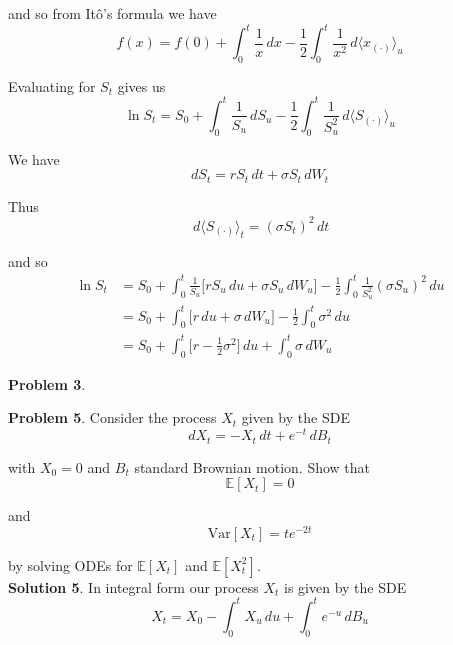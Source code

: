 \documentclass[12pt]{article}
\begin{document}
and so from It\^{o}'s formula we have
\begin{equation*}
	f(x) = f(0) + \int^t_0 \frac{1}{x} \,dx - \frac{1}{2}\int^t_0 \frac{1}{x^2} \,d\langle x_{(\cdot)}\rangle_u
\end{equation*}

Evaluating for $S_t$ gives us
\begin{equation*}
	\ln S_t = S_0 + \int^t_0 \frac{1}{S_u} \,dS_u - \frac{1}{2}\int^t_0 \frac{1}{S_u^2} \,d\langle S_{(\cdot)}\rangle_u
\end{equation*}

We have
\begin{equation*}
	dS_t = rS_t\,dt + \sigma S_t\,dW_t
\end{equation*}

Thus
\begin{equation*}
	\,d\langle S_{(\cdot)}\rangle_t = (\sigma S_t)^2\,dt
\end{equation*}

and so
\begin{align*}
	\ln S_t &= S_0 + \int^t_0 \frac{1}{S_u} \big[rS_u\,du + \sigma S_u\,dW_u \big] - \frac{1}{2}\int^t_0 \frac{1}{S_u^2} (\sigma S_u)^2\,du \\
	&= S_0 + \int^t_0 \big[r\,du + \sigma\,dW_u \big] - \frac{1}{2}\int^t_0 \sigma^2\,du \\
	&= S_0 + \int^t_0 \big[r - \frac{1}{2}\sigma^2\big] \,du + \int^t_0 \sigma\,dW_u
\end{align*}



{\bf Problem 3}.

{\bf Problem 5}. Consider the process $X_t$ given by the SDE
\begin{equation*}
	dX_t = -X_t\,dt + e^{-t}\,dB_t
\end{equation*}

with $X_0 = 0$ and $B_t$ standard Brownian motion. Show that
\begin{equation*}
	\mathbb E[X_t] = 0
\end{equation*}

and 
\begin{equation*}
	\mathrm {Var}[X_t] = te^{-2t}
\end{equation*}

by solving ODEs for $\mathbb E[X_t]$ and $\mathbb E[X_t^2]$. \\

{\bf Solution 5}. In integral form our process $X_t$ is given by the SDE
\begin{equation*}
	X_t = X_0 - \int^t_0 X_u \,du + \int^t_0 e^{-u}\,dB_u
\end{equation*}
\end{document}
